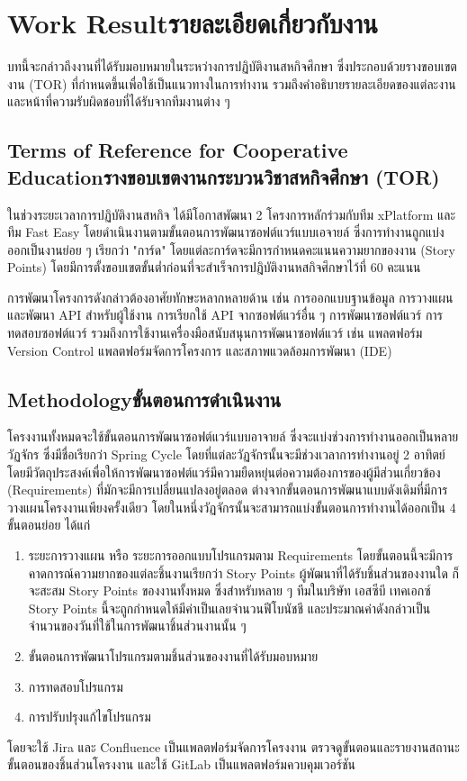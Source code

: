 \chapter{\ifenglish Work Result\else รายละเอียดเกี่ยวกับงาน\fi}
บทนี้จะกล่าวถึงงานที่ได้รับมอบหมายในระหว่างการปฏิบัติงานสหกิจศึกษา ซึ่งประกอบด้วยรางขอบเขตงาน (TOR) ที่กำหนดขึ้นเพื่อใช้เป็นแนวทางในการทำงาน รวมถึงคำอธิบายรายละเอียดของแต่ละงานและหน้าที่ความรับผิดชอบที่ได้รับจากทีมงานต่าง ๆ

\section{\ifenglish Terms of Reference for Cooperative Education\else รางขอบเขตงานกระบวนวิชาสหกิจศึกษา (TOR) \fi}
ในช่วงระยะเวลาการปฏิบัติงานสหกิจ ได้มีโอกาสพัฒนา 2 โครงการหลักร่วมกับทีม xPlatform และทีม Fast Easy โดยดำเนินงานตามขั้นตอนการพัฒนาซอฟต์แวร์แบบเอจายล์ ซึ่งการทำงานถูกแบ่งออกเป็นงานย่อย ๆ เรียกว่า "การ์ด" โดยแต่ละการ์ดจะมีการกำหนดคะแนนความยากของงาน (Story Points) โดยมีการตั้งขอบเขตขั้นต่ำก่อนที่จะสำเร็จการปฎิบัติงานหสกิจศึกษาไว้ที่ 60 คะแนน

การพัฒนาโครงการดังกล่าวต้องอาศัยทักษะหลากหลายด้าน เช่น การออกแบบฐานข้อมูล การวางแผนและพัฒนา API สำหรับผู้ใช้งาน การเรียกใช้ API จากซอฟต์แวร์อื่น ๆ การพัฒนาซอฟต์แวร์ การทดสอบซอฟต์แวร์ รวมถึงการใช้งานเครื่องมือสนับสนุนการพัฒนาซอฟต์แวร์ เช่น แพลตฟอร์ม Version Control แพลตฟอร์มจัดการโครงการ และสภาพแวดล้อมการพัฒนา (IDE)

\section{\ifenglish Methodology\else ขั้นตอนการดำเนินงาน \fi}
โครงงานทั้งหมดจะใช้ขั้นตอนการพัฒนาซอฟต์แวร์แบบอาจายล์ ซึ่งจะแบ่งช่วงการทำงานออกเป็นหลายวัฏจักร ซึ่งมีชื่อเรียกว่า Spring Cycle โดยที่แต่ละวัฏจักรนั้นจะมีช่วงเวลาการทำงานอยู่ 2 อาทิตย์ โดยมีวัตถุประสงค์เพื่อให้การพัฒนาซอฟต์แวร์มีความยืดหยุ่นต่อความต้องการของผู้มีส่วนเกี่ยวข้อง (Requirements) ที่มักจะมีการเปลี่ยนแปลงอยู่ตลอด ต่างจากขั้นตอนการพัฒนาแบบดังเดิมที่มีการวางแผนโครงงานเพียงครั้งเดียว โดยในหนึ่งวัฏจักรนั้นจะสามารถแบ่งขั้นตอนการทำงานได้ออกเป็น 4 ขั้นตอนย่อย ได้แก่
\begin{enumerate}
    \item ระยะการวางแผน หรือ ระยะการออกแบบโปรแกรมตาม Requirements โดยขั้นตอนนี้จะมีการคาดการณ์ความยากของแต่ละชิ้นงานเรียกว่า Story Points ผู้พัฒนาที่ได้รับชิ้นส่วนของงานใด ก็จะสะสม Story Points ของงานทั้งหมด ซึ่งสำหรับหลาย ๆ ทีมในบริษัท เอสซีบี เทคเอกซ์ Story Points นี้จะถูกกำหนดให้มีค่าเป็นเลยจำนวนฟีโบนัชชี และประมาณค่าดังกล่าวเป็นจำนวนของวันที่ใช้ในการพัฒนาชิ้นส่วนงานนั้น ๆ 
    \item ขั้นตอนการพัฒนาโปรแกรมตามชิ้นส่วนของงานที่ได้รับมอบหมาย
    \item การทดสอบโปรแกรม
    \item การปรับปรุงแก้ไขโปรแกรม
\end{enumerate}
โดยจะใช้ Jira และ Confluence เป็นแพลตฟอร์มจัดการโครงงาน ตรวจดูขั้นตอนและรายงานสถานะขั้นตอนของชิ้นส่วนโครงงาน และใช้ GitLab เป็นแพลตฟอร์มควบคุมเวอร์ชัน


